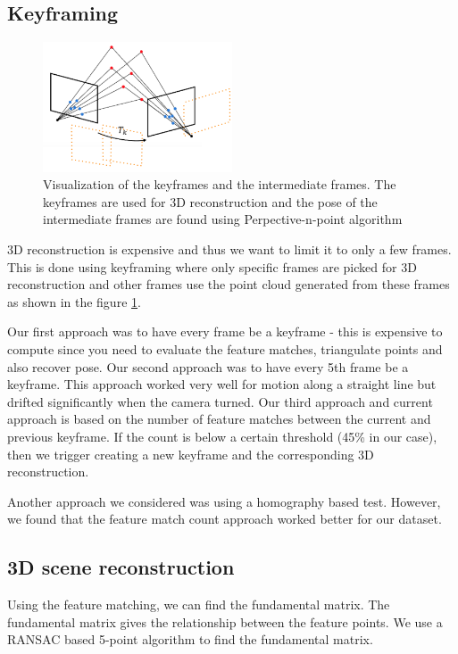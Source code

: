 \documentclass{article}
\begin{document}
\subsection{Keyframing}

\begin{figure}
\centering
\includegraphics[width=0.5\textwidth]{./system_viz}
\caption{Visualization of the keyframes and the intermediate frames. The keyframes are used for 3D reconstruction and the pose of the intermediate frames are found using Perpective-n-point algorithm}
\label{fig:keyframing}
\end{figure}

3D reconstruction is expensive and thus we want to limit it to only a few frames. This is done using keyframing where only specific frames are picked for 3D reconstruction and other frames use the point cloud generated from these frames as shown in the figure \ref{fig:keyframing}.

Our first approach was to have every frame be a keyframe - this is expensive to compute since you need to evaluate the feature matches, triangulate points and also recover pose. Our second approach was to have every 5th frame be a keyframe. This approach worked very well for motion along a straight line but drifted significantly when the camera turned. Our third approach and current approach is based on the number of feature matches between the current and previous keyframe. If the count is below a certain threshold (45\% in our case), then we trigger creating a new keyframe and the corresponding 3D reconstruction.

Another approach we considered was using a homography based test\cite{homography}. However, we found that the feature match count approach worked better for our dataset.

\subsection{3D scene reconstruction}
Using the feature matching, we can find the fundamental matrix. The fundamental matrix gives the relationship between the feature points. We use a RANSAC based 5-point algorithm to find the fundamental matrix.
\end{document}
